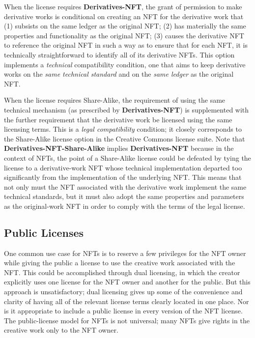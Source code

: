 \documentclass{article}
\newcommand{\keyword}[1]{\textbf{#1}\xspace}
\newcommand{\derivativetracking}{\keyword{Derivatives-NFT}}
\newcommand{\sharealike}{\keyword{Derivatives-NFT-Share-Alike}}
\begin{document}
When the license requires \derivativetracking, the grant of permission to make derivative works is conditional on creating an NFT for the derivative work that (1) subsists on the same ledger as the original NFT; (2) has materially the same properties and functionality as the original NFT; (3) causes the derivative NFT to reference the original NFT in such a way as to ensure that for each NFT, it is technically straightforward to identify all of its derivative NFTs. This option implements a \emph{technical} compatibility condition, one that aims to keep derivative works on the \emph{same technical standard} and on the \emph{same ledger} as the original NFT. 

When the license requires Share-Alike, the requirement of using the same technical mechanism (as prescribed by \derivativetracking) is supplemented with the further requirement that the derivative work be licensed using the same licensing terms. This is a \emph{legal compatibility} condition; it closely corresponds to the Share-Alike license option in the Creative Commons license suite. Note that \sharealike implies \derivativetracking because in the context of NFTs, the point of a Share-Alike license could be defeated by tying the license to a derivative-work NFT whose technical implementation departed too significantly from the implementation of the underlying NFT. This means that not only must the NFT associated with the derivative work implement the same technical standards, but it must also adopt the same properties and parameters as the original-work NFT in order to comply with the terms of the legal license.

\subsection{Public Licenses}

One common use case for NFTs is to reserve a few privileges for the NFT owner while giving the public a license to use the creative work associated with the NFT. This could be accomplished through dual licensing, in which the creator explicitly uses one license for the NFT owner and another for the public. But this approach is unsatisfactory; dual licensing gives up some of the convenience and clarity of having all of the relevant license terms clearly located in one place. Nor is it appropriate to include a public license in every version of the NFT license. The public-license model for NFTs is not universal; many NFTs give rights in the creative work only to the NFT owner.
\end{document}
